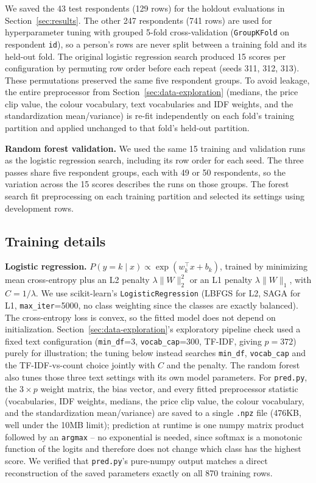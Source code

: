 \documentclass[12pt]{article}
\begin{document}
We saved the 43 test respondents (129 rows) for the holdout evaluations in
Section~\ref{sec:results}. The other 247 respondents (741 rows) are used for hyperparameter
tuning with grouped 5-fold cross-validation (\texttt{GroupKFold} on respondent \texttt{id}), so a
person's rows are never split between a training fold and its held-out fold. The original
logistic regression search produced 15 scores per configuration by permuting row order before
each repeat (seeds 311, 312, 313). These permutations preserved the same five respondent groups.
To avoid
leakage, the entire preprocessor from Section~\ref{sec:data-exploration} (medians, the price clip
value, the colour vocabulary, text vocabularies and IDF weights, and the standardization
mean/variance) is re-fit independently on each fold's training partition and applied unchanged to
that fold's held-out partition.

\textbf{Random forest validation.} We used the same 15 training and validation runs as the
logistic regression search, including its row order for each seed. The three passes share
five respondent groups, each with 49 or 50 respondents, so the variation across the 15 scores
describes the runs on those groups. The forest search fit preprocessing on each training
partition and selected its settings using development rows.

\subsection{Training details}

\textbf{Logistic regression.} $P(y=k\mid x) \propto \exp(w_k^\top x + b_k)$, trained by minimizing
mean cross-entropy plus an L2 penalty $\lambda\lVert W\rVert_2^2$ or an L1 penalty
$\lambda\lVert W\rVert_1$, with $C=1/\lambda$. We use scikit-learn's
\texttt{LogisticRegression} (LBFGS for L2, SAGA for L1,
\texttt{max\_iter}=5000, no class weighting since the classes are exactly balanced). The
cross-entropy loss is convex, so the fitted model does not depend on initialization.
Section~\ref{sec:data-exploration}'s exploratory pipeline check used a fixed text configuration
(\texttt{min\_df}=3, \texttt{vocab\_cap}=300, TF-IDF, giving $p=372$) purely for illustration; the
tuning below instead searches \texttt{min\_df}, \texttt{vocab\_cap} and the TF-IDF-vs-count choice
jointly with $C$ and the penalty. The random forest also tunes those three text settings
with its own model parameters. For \texttt{pred.py}, the
$3 \times p$ weight matrix, the bias vector, and every fitted preprocessor statistic (vocabularies,
IDF weights, medians, the price clip value, the colour vocabulary, and the standardization
mean/variance) are saved to a single \texttt{.npz} file (476KB, well under the 10MB limit);
prediction at runtime is one numpy matrix product followed by an \texttt{argmax} -- no exponential
is needed, since softmax is a monotonic function of the logits and therefore does not change which
class has the highest score. We verified that \texttt{pred.py}'s pure-numpy output matches a direct
reconstruction of the saved parameters exactly on all 870 training rows.
\end{document}
